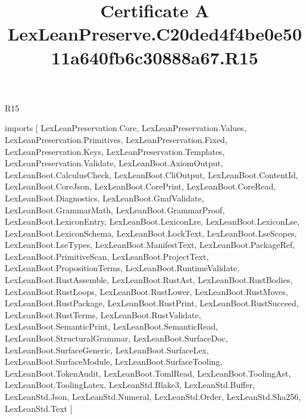 \begin{lexlean}{R15}
\title{Certificate A LexLeanPreserve.C20ded4f4be0e5011a640fb6c30888a67.R15}
\begin{coremodule}
imports [
  LexLeanPreservation.Core,
  LexLeanPreservation.Values,
  LexLeanPreservation.Primitives,
  LexLeanPreservation.Fixed,
  LexLeanPreservation.Keys,
  LexLeanPreservation.Templates,
  LexLeanPreservation.Validate,
  LexLeanBoot.AxiomOutput,
  LexLeanBoot.CalculusCheck,
  LexLeanBoot.CliOutput,
  LexLeanBoot.ContentId,
  LexLeanBoot.CoreJson,
  LexLeanBoot.CorePrint,
  LexLeanBoot.CoreRead,
  LexLeanBoot.Diagnostics,
  LexLeanBoot.GnafValidate,
  LexLeanBoot.GrammarMath,
  LexLeanBoot.GrammarProof,
  LexLeanBoot.LexiconEntry,
  LexLeanBoot.LexiconLre,
  LexLeanBoot.LexiconLse,
  LexLeanBoot.LexiconSchema,
  LexLeanBoot.LockText,
  LexLeanBoot.LseScopes,
  LexLeanBoot.LseTypes,
  LexLeanBoot.ManifestText,
  LexLeanBoot.PackageRef,
  LexLeanBoot.PrimitiveScan,
  LexLeanBoot.ProjectText,
  LexLeanBoot.PropositionTerms,
  LexLeanBoot.RuntimeValidate,
  LexLeanBoot.RustAssemble,
  LexLeanBoot.RustAst,
  LexLeanBoot.RustBodies,
  LexLeanBoot.RustLoops,
  LexLeanBoot.RustLower,
  LexLeanBoot.RustMoves,
  LexLeanBoot.RustPackage,
  LexLeanBoot.RustPrint,
  LexLeanBoot.RustSucceed,
  LexLeanBoot.RustTerms,
  LexLeanBoot.RustValidate,
  LexLeanBoot.SemanticPrint,
  LexLeanBoot.SemanticRead,
  LexLeanBoot.StructuralGrammar,
  LexLeanBoot.SurfaceDoc,
  LexLeanBoot.SurfaceGeneric,
  LexLeanBoot.SurfaceLex,
  LexLeanBoot.SurfaceModule,
  LexLeanBoot.SurfaceTooling,
  LexLeanBoot.TokenAudit,
  LexLeanBoot.TomlRead,
  LexLeanBoot.ToolingAst,
  LexLeanBoot.ToolingLatex,
  LexLeanStd.Blake3,
  LexLeanStd.Buffer,
  LexLeanStd.Json,
  LexLeanStd.Numeral,
  LexLeanStd.Order,
  LexLeanStd.Sha256,
  LexLeanStd.Text
]


\end{coremodule}
\end{lexlean}
